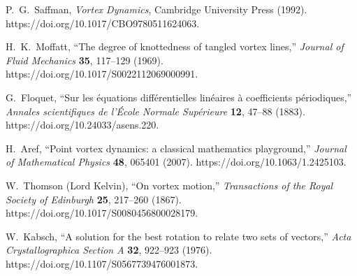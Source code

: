 P.~G.~Saffman,
\emph{Vortex Dynamics},
Cambridge University Press (1992).
https://doi.org/10.1017/CBO9780511624063.

H.~K.~Moffatt,
``The degree of knottedness of tangled vortex lines,''
\emph{Journal of Fluid Mechanics} \textbf{35}, 117--129 (1969).
https://doi.org/10.1017/S0022112069000991.

G.~Floquet,
``Sur les équations différentielles linéaires à coefficients périodiques,''
\emph{Annales scientifiques de l'École Normale Supérieure} \textbf{12}, 47--88 (1883).
https://doi.org/10.24033/asens.220.

H.~Aref,
``Point vortex dynamics: a classical mathematics playground,''
\emph{Journal of Mathematical Physics} \textbf{48}, 065401 (2007).
https://doi.org/10.1063/1.2425103.

W.~Thomson (Lord Kelvin),
``On vortex motion,''
\emph{Transactions of the Royal Society of Edinburgh} \textbf{25}, 217--260 (1867).
https://doi.org/10.1017/S0080456800028179.

W.~Kabsch,
``A solution for the best rotation to relate two sets of vectors,''
\emph{Acta Crystallographica Section A} \textbf{32}, 922--923 (1976).
https://doi.org/10.1107/S0567739476001873.
